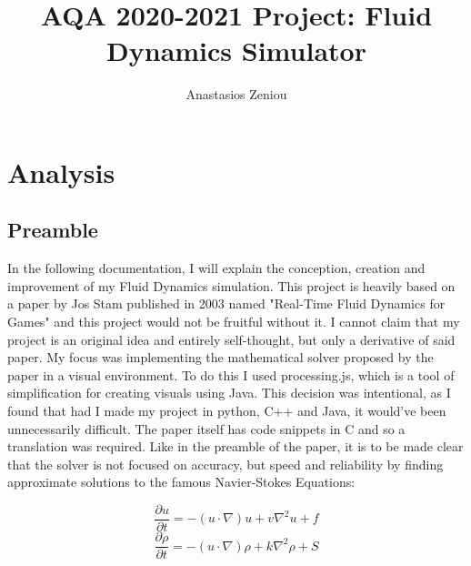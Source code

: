 \documentclass[12pt,a4paper]{book}
\begin{document}
\title{\textbf{AQA 2020-2021 Project: Fluid Dynamics Simulator}}
\author{Anastasios Zeniou}

\date{}
\maketitle
\tableofcontents

\pagebreak


\chapter{Analysis}
\section{Preamble}
In the following documentation, I will explain the conception, creation and improvement of my Fluid Dynamics simulation. This project is heavily based on a paper by Jos Stam published in 2003 named "Real-Time Fluid Dynamics for Games"\cite{josrtfdg} and this project would not be fruitful without it. I cannot claim that my project is an original idea and entirely self-thought, but only a derivative of said paper. My focus was implementing the mathematical solver proposed by the paper in a visual environment. To do this I used processing.js, which is a tool of simplification for creating visuals using Java. This decision was intentional, as I found that had I made my project in python, C++ and Java, it would've been unnecessarily difficult. The paper itself has code snippets in C \cite{josccode} and so a translation was required. Like in the preamble of the paper, it is to be made clear that the solver is not focused on accuracy, but speed and reliability by finding approximate solutions to the famous Navier-Stokes Equations:

\begin{equation*}\label{nseq:vel}
	\dfrac{\partial u}{\partial t} = -(u\cdot \nabla)u + v{\nabla}^2u + f
\end{equation*}
\begin{equation*}\label{nseq:den}
	\dfrac{\partial \rho}{\partial t} = -(u \cdot \nabla)\rho + k{\nabla}^2\rho + S
\end{equation*}
\end{document}
